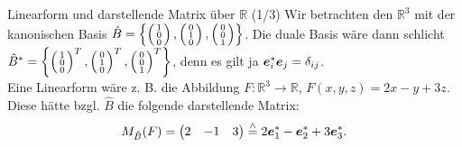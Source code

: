 \begin{Beispiel}
{Linearform und darstellende Matrix über $\mathbb{R}$ (1/3)}
Wir betrachten den $\mathbb{R}^3$ mit der kanonischen Basis $\hat{B}=\left\{\left(\begin{smallmatrix}1\\0\\0\end{smallmatrix}\right),\left(\begin{smallmatrix}0\\1\\0\end{smallmatrix}\right),\left(\begin{smallmatrix}0\\0\\1\end{smallmatrix}\right)\right\}$. Die duale Basis wäre dann schlicht $\hat{B}^*=\left\{\left(\begin{smallmatrix}1\\0\\0\end{smallmatrix}\right)^T,\left(\begin{smallmatrix}0\\1\\0\end{smallmatrix}\right)^T,\left(\begin{smallmatrix}0\\0\\1\end{smallmatrix}\right)^T\right\}$, denn es gilt ja ${{\text{\boldmath${e}$}}}_i^*{{\text{\boldmath${e}$}}}_j=\delta_{ij}$.\\
Eine Linearform wäre z. B. die Abbildung $F:\mathbb{R}^3\to\mathbb{R},\, F(x,y,z)=2x-y+3z$. Diese hätte bzgl. $\hat{B}$ die folgende darstellende Matrix:
\begin{equation*}
    M_{\hat{B}}(F)=\begin{pmatrix}2&-1&3\end{pmatrix}\overset{\wedge}{=}2{{\text{\boldmath${e}$}}}_1^*-{{\text{\boldmath${e}$}}}_2^*+3{{\text{\boldmath${e}$}}}_3^*.
\end{equation*}
\end{Beispiel}

